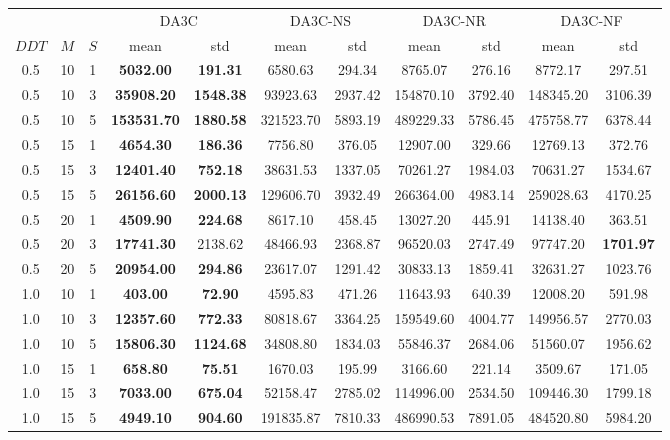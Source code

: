 \begin{tabular}{ccccccccccc}
\toprule
     & & & \multicolumn{2}{c}{DA3C} & \multicolumn{2}{c}{DA3C-NS} & \multicolumn{2}{c}{DA3C-NR} & \multicolumn{2}{c}{DA3C-NF} \\ \cline{4-11}
$DDT$ & $M$ & $S$ & mean & std & mean & std & mean & std & mean & std \\
\midrule
0.5 & 10 & 1 & \textbf{5032.00} & \textbf{191.31} & 6580.63 & 294.34 & 8765.07 & 276.16 & 8772.17 & 297.51 \\
0.5 & 10 & 3 & \textbf{35908.20} & \textbf{1548.38} & 93923.63 & 2937.42 & 154870.10 & 3792.40 & 148345.20 & 3106.39 \\
0.5 & 10 & 5 & \textbf{153531.70} & \textbf{1880.58} & 321523.70 & 5893.19 & 489229.33 & 5786.45 & 475758.77 & 6378.44 \\
0.5 & 15 & 1 & \textbf{4654.30} & \textbf{186.36} & 7756.80 & 376.05 & 12907.00 & 329.66 & 12769.13 & 372.76 \\
0.5 & 15 & 3 & \textbf{12401.40} & \textbf{752.18} & 38631.53 & 1337.05 & 70261.27 & 1984.03 & 70631.27 & 1534.67 \\
0.5 & 15 & 5 & \textbf{26156.60} & \textbf{2000.13} & 129606.70 & 3932.49 & 266364.00 & 4983.14 & 259028.63 & 4170.25 \\
0.5 & 20 & 1 & \textbf{4509.90} & \textbf{224.68} & 8617.10 & 458.45 & 13027.20 & 445.91 & 14138.40 & 363.51 \\
0.5 & 20 & 3 & \textbf{17741.30} & 2138.62 & 48466.93 & 2368.87 & 96520.03 & 2747.49 & 97747.20 & \textbf{1701.97} \\
0.5 & 20 & 5 & \textbf{20954.00} & \textbf{294.86} & 23617.07 & 1291.42 & 30833.13 & 1859.41 & 32631.27 & 1023.76 \\
1.0 & 10 & 1 & \textbf{403.00} & \textbf{72.90} & 4595.83 & 471.26 & 11643.93 & 640.39 & 12008.20 & 591.98 \\
1.0 & 10 & 3 & \textbf{12357.60} & \textbf{772.33} & 80818.67 & 3364.25 & 159549.60 & 4004.77 & 149956.57 & 2770.03 \\
1.0 & 10 & 5 & \textbf{15806.30} & \textbf{1124.68} & 34808.80 & 1834.03 & 55846.37 & 2684.06 & 51560.07 & 1956.62 \\
1.0 & 15 & 1 & \textbf{658.80} & \textbf{75.51} & 1670.03 & 195.99 & 3166.60 & 221.14 & 3509.67 & 171.05 \\
1.0 & 15 & 3 & \textbf{7033.00} & \textbf{675.04} & 52158.47 & 2785.02 & 114996.00 & 2534.50 & 109446.30 & 1799.18 \\
1.0 & 15 & 5 & \textbf{4949.10} & \textbf{904.60} & 191835.87 & 7810.33 & 486990.53 & 7891.05 & 484520.80 & 5984.20 \\

\end{tabular}
